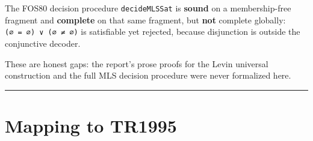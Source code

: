 \documentclass[11pt,a4paper]{article}
\begin{document}
The FOS80 decision procedure \texttt{decideMLSSat} is \textbf{sound} on a membership-free fragment and \textbf{complete} on that same fragment, but \textbf{not} complete globally: \texttt{(∅\ =\ ∅)\ ∨\ (∅\ ≠\ ∅)} is satisfiable yet rejected, because disjunction is outside the conjunctive decoder.

These are honest gaps: the report's prose proofs for the Levin universal construction and the full MLS decision procedure were never formalized here.

\begin{center}\rule{0.5\linewidth}{0.5pt}\end{center}

\hypertarget{mapping-to-tr1995}{%
\section{Mapping to TR1995}\label{mapping-to-tr1995}}
\end{document}

